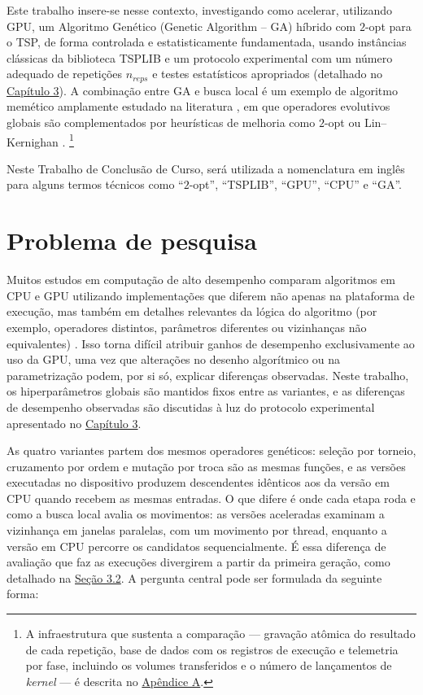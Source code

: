 Este trabalho insere-se nesse contexto, investigando como acelerar, utilizando GPU, um Algoritmo Genético (Genetic Algorithm -- GA) híbrido com \(2\)-opt para o TSP, de forma controlada e estatisticamente fundamentada, usando instâncias clássicas da biblioteca TSPLIB \autocite{reinelt1991tsplib} e um protocolo experimental com um número adequado de repetições \(n_{reps}\) e testes estatísticos apropriados (detalhado no \hyperref[cap3-materiais-metodos]{Capítulo 3}).
A combinação entre GA e busca local é um exemplo de algoritmo memético amplamente estudado na literatura \autocite{larranaga1999genetic,goldberg1989genetic}, em que operadores evolutivos globais são complementados por heurísticas de melhoria como \(2\)-opt \autocite{croes1958method} ou Lin--Kernighan \autocite{lin1973efficient}.
\footnote{A infraestrutura que sustenta a comparação --- gravação atômica do resultado de cada repetição, base de dados com os registros de execução e telemetria por fase, incluindo os volumes transferidos e o número de lançamentos de \emph{kernel} --- é descrita no \hyperref[apendice-framework]{Apêndice A}.}

Neste Trabalho de Conclusão de Curso, será utilizada a nomenclatura em inglês para alguns termos técnicos como ``\(2\)-opt'', ``TSPLIB'', ``GPU'', ``CPU'' e ``GA''.

\section{Problema de pesquisa}\label{sec-12-problema-de-pesquisa}

Muitos estudos em computação de alto desempenho comparam algoritmos em CPU e GPU utilizando implementações que diferem não apenas na plataforma de execução, mas também em detalhes relevantes da lógica do algoritmo (por exemplo, operadores distintos, parâmetros diferentes ou vizinhanças não equivalentes) \autocite{schulz2013gpu,van2013gpu,benaini2018genetic}.
Isso torna difícil atribuir ganhos de desempenho exclusivamente ao uso da GPU, uma vez que alterações no desenho algorítmico ou na parametrização podem, por si só, explicar diferenças observadas.
Neste trabalho, os hiperparâmetros globais são mantidos fixos entre as variantes, e as diferenças de desempenho observadas são discutidas à luz do protocolo experimental apresentado no \hyperref[cap3-materiais-metodos]{Capítulo 3}.

As quatro variantes partem dos mesmos operadores genéticos: seleção por torneio, cruzamento por ordem e mutação por troca são as mesmas funções, e as versões executadas no dispositivo produzem descendentes idênticos aos da versão em CPU quando recebem as mesmas entradas.
O que difere é onde cada etapa roda e como a busca local avalia os movimentos: as versões aceleradas examinam a vizinhança em janelas paralelas, com um movimento por thread, enquanto a versão em CPU percorre os candidatos sequencialmente. É essa diferença de avaliação que faz as execuções divergirem a partir da primeira geração, como detalhado na \hyperref[sec-32-arquitetura-variantes]{Seção 3.2}.
A pergunta central pode ser formulada da seguinte forma:

